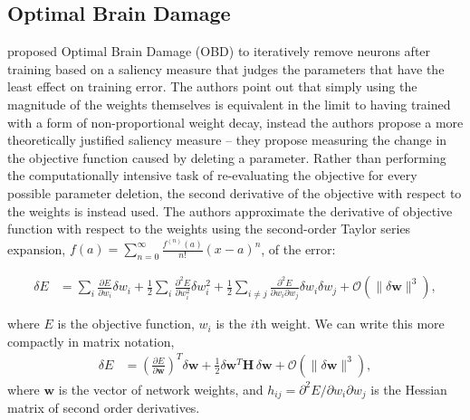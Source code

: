 \documentclass[thesis]{subfiles}
\begin{document}
       \subsection{Optimal Brain Damage}
       \citet{lecun1989optimal} proposed Optimal Brain Damage (OBD) to iteratively remove neurons after training based on a saliency measure that judges the parameters that have the least effect on training error. The authors point out that simply using the magnitude of the weights themselves is equivalent in the limit to having trained with a form of non-proportional weight decay, instead the authors propose a more theoretically justified saliency measure -- they propose measuring the change in the objective function caused by deleting a parameter. Rather than performing the computationally intensive task of re-evaluating the objective for every possible parameter deletion, the second derivative of the objective with respect to the weights is instead used. The authors approximate the derivative of objective function with respect to the weights using the second-order Taylor series expansion, $f(a) = \sum_{n=0}^\infty \frac{f^{(n)}(a)}{n!} (x - a)^n$, of the error:
	       
       
       \begin{align}
           \delta E &= \sum_i \frac{\partial E}{\partial w_i} \delta w_i + \frac{1}{2} \sum_i \frac{\partial^2 E}{\partial w_i^2} \delta w_i^2 + \frac{1}{2} \sum_{i\neq j} \frac{\partial^2 E}{\partial w_i \partial w_j} \delta w_i \delta w_j +\mathcal{O}(\|\delta \mathbf{w}\|^3),
       \end{align}
       
       where $E$ is the objective function, $w_i$ is the $i$th weight. We can write this more compactly in matrix notation,
       \begin{align}
           \delta E &= \left( \frac{\partial E}{\partial \mathbf{w}} \right)^T \delta \mathbf{w} +\frac{1}{2}\delta \mathbf{w}^T \mathbf{H}\, \delta \mathbf{w} +\mathcal{O}(\|\delta \mathbf{w}\|^3),
       \end{align}
       where $\mathbf{w}$ is the vector of network weights, and $h_{ij}=\partial^2 E / \partial w_i \partial w_j$ is the Hessian matrix of second order derivatives. 
       
\end{document}
